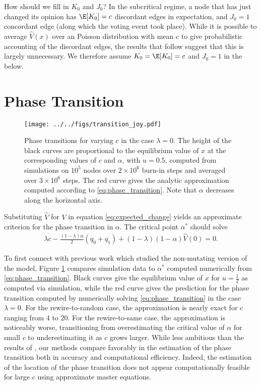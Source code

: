 \documentclass[english]{scrartcl}
\begin{document}
	How should we fill in $K_0$ and $J_0$? In the subcritical regime, a node that has just changed its opinion has $\E[K_0] = c$ discordant edges in expectation, and $J_0 = 1$ concordant edge (along which the voting event took place). While it is possible to average $\hat{V}(x)$ over an Poisson distribution with mean $c$ to give probabilistic accounting of the discordant edges, the results that follow suggest that this is largely unnecessary. We therefore assume $K_0 = \E[K_0] = c$ and $J_0 = 1$ in the below. 


\section{Phase Transition}

	\begin{figure}
		\centering
		\texttt{[image: ../../figs/transition\_joy.pdf]}
		\caption{Phase transitions for varying $c$ in the case $\lambda = 0$. The height of the black curves are proportional to the equilibrium value of $x$ at the corresponding values of $c$ and $\alpha$, with $u = 0.5$, computed from simulations on $10^5$ nodes over $2\times 10^6$ burn-in steps and averaged over $3 \times 10^6$ steps. The red curve gives the analytic approximation computed according to \eqref{eq:phase_transition}. Note that $\alpha$ decreases along the horizontal axis.} \label{fig:detailed_transition}
	\end{figure}

	Substituting $\hat{V}$ for $V$ in equation \eqref{eq:expected_change} yields an approximate criterion for the phase transition in $\alpha$. The critical point $\alpha^*$ should solve
	\begin{align}
		\lambda c - \frac{(1-\lambda)\alpha}{2}(q_0 + q_1) +(1-\lambda)(1-\alpha)\hat{V}(0) = 0. \label{eq:phase_transition}
	\end{align}
	
	To first connect with previous work which studied the non-mutating version of the model, Figure \ref{fig:detailed_transition} compares simulation data to $\alpha^*$ computed numerically from \eqref{eq:phase_transition}. Black curves give the equilibrium value of $x$ for $u = \frac{1}{2}$ as computed via simulation, while the red curve gives the prediction for the phase transition computed by numerically solving \eqref{eq:phase_transition} in the case $\lambda = 0$. For the rewire-to-random case, the approximation is nearly exact for $c$ ranging from $4$ to $20$. For the rewire-to-same case, the approximation is noticeably worse, transitioning from overestimating the critical value of $\alpha$ for small $c$ to underestimating it as $c$ grows larger. While less ambitious than the results of \cite{Durrett2012}, our methods compare favorably in the estimation of the phase transition both in accuracy and computational efficiency. Indeed, the estimation of the location of the phase transition does not appear computationally feasible for large $c$ using approximate master equations. 
\end{document}
